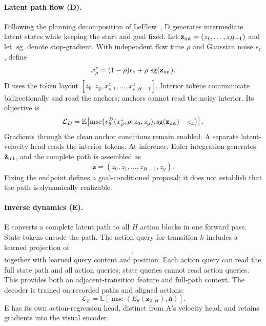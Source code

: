 \paragraph{Latent path flow (D).}
Following the planning decomposition of LeFlow~\cite{huang2026leflow}, D generates intermediate latent states while keeping the start and goal fixed. Let $\mathbf z_{\rm int}=(z_1,\ldots,z_{H-1})$ and let $\operatorname{sg}$ denote stop-gradient. With independent flow time $\rho$ and Gaussian noise $\epsilon_z$, define
\begin{equation}
  x^z_\rho=(1-\rho)\epsilon_z+
  \rho\,\operatorname{sg}(\mathbf z_{\rm int}).
\end{equation}
D uses the token layout $[z_0,z_g,x^z_{\rho,1},\ldots,x^z_{\rho,H-1}]$. Interior tokens communicate bidirectionally and read the anchors; anchors cannot read the noisy interior. Its objective is
\begin{equation}
 \mathcal L_D=\mathbb E\!\left[
 \operatorname{mse}\!\left(
 v^D_\theta(x^z_\rho,\rho;z_0,z_g),
 \operatorname{sg}(\mathbf z_{\rm int})-\epsilon_z
 \right)\right].
 \label{eq:path_loss}
\end{equation}
Gradients through the clean anchor conditions remain enabled. A separate latent-velocity head reads the interior tokens. At inference, Euler integration generates $\tilde{\mathbf z}_{\rm int}$, and the complete path is assembled as
\begin{equation}
  \tilde{\mathbf z}=(z_0,\tilde z_1,\ldots,\tilde z_{H-1},z_g).
\end{equation}
Fixing the endpoint defines a goal-conditioned proposal; it does not establish that the path is dynamically realizable.

\paragraph{Inverse dynamics (E).}
E converts a complete latent path to all $H$ action blocks in one forward pass. State tokens encode the path. The action query for transition $h$ includes a learned projection of
\begin{equation}
  [z_h,z_{h+1},z_{h+1}-z_h],
\end{equation}
together with learned query content and position. Each action query can read the full state path and all action queries; state queries cannot read action queries. This provides both an adjacent-transition feature and full-path context.
The decoder is trained on recorded paths and aligned actions:
\begin{equation}
  \mathcal L_E=\mathbb E\!\left[
     \operatorname{mse}\!\left(E_\theta(\mathbf z_{0:H}),\mathbf a\right)
  \right].
\end{equation}
E has its own action-regression head, distinct from A's velocity head, and retains gradients into the visual encoder.

